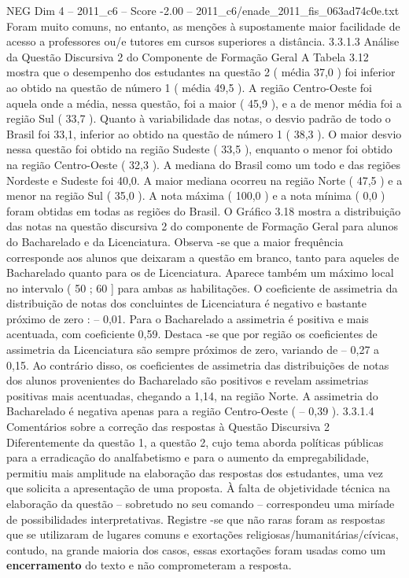 \begin{textsample}{NEG Dim 4 – 2011\_c6 – Score -2.00 – 2011\_c6/enade\_2011\_fis\_063ad74c0e.txt}
Foram muito comuns, no entanto, as menções à supostamente maior facilidade de acesso a professores ou/e tutores em cursos superiores a distância. 3.3.1.3 Análise da Questão Discursiva 2 do Componente de Formação Geral A Tabela 3.12 mostra que o desempenho dos estudantes na questão 2 ( média 37,0 ) foi inferior ao obtido na questão de número 1 ( média 49,5 ).
A região Centro-Oeste foi aquela onde a média, nessa questão, foi a maior ( 45,9 ), e a de menor média foi a região Sul ( 33,7 ).
Quanto à variabilidade das notas, o desvio padrão de todo o Brasil foi 33,1, inferior ao obtido na questão de número 1 ( 38,3 ).
O maior desvio nessa questão foi obtido na região Sudeste ( 33,5 ), enquanto o menor foi obtido na região Centro-Oeste ( 32,3 ).
A mediana do Brasil como um todo e das regiões Nordeste e Sudeste foi 40,0.
A maior mediana ocorreu na região Norte ( 47,5 ) e a menor na região Sul ( 35,0 ).
A nota máxima ( 100,0 ) e a nota mínima ( 0,0 ) foram obtidas em todas as regiões do Brasil.
O Gráfico 3.18 mostra a distribuição das notas na questão discursiva 2 do componente de Formação Geral para alunos do Bacharelado e da Licenciatura.
Observa -se que a maior frequência corresponde aos alunos que deixaram a questão em branco, tanto para aqueles de Bacharelado quanto para os de Licenciatura.
Aparece também um máximo local no intervalo ( 50 ; 60 ] para ambas as habilitações.
O coeficiente de assimetria da distribuição de notas dos concluintes de Licenciatura é negativo e bastante próximo de zero : – 0,01.
Para o Bacharelado a assimetria é positiva e mais acentuada, com coeficiente 0,59.
Destaca -se que por região os coeficientes de assimetria da Licenciatura são sempre próximos de zero, variando de – 0,27 a 0,15.
Ao contrário disso, os coeficientes de assimetria das distribuições de notas dos alunos provenientes do Bacharelado são positivos e revelam assimetrias positivas mais acentuadas, chegando a 1,14, na região Norte.
A assimetria do Bacharelado é negativa apenas para a região Centro-Oeste ( – 0,39 ). 3.3.1.4 Comentários sobre a correção das respostas à Questão Discursiva 2 Diferentemente da questão 1, a questão 2, cujo tema aborda políticas públicas para a erradicação do analfabetismo e para o aumento da empregabilidade, permitiu mais amplitude na elaboração das respostas dos estudantes, uma vez que solicita a apresentação de uma proposta.
À falta de objetividade técnica na elaboração da questão – sobretudo no seu comando – correspondeu uma miríade de possibilidades interpretativas.
Registre -se que não raras foram as respostas que se utilizaram de lugares comuns e exortações religiosas/humanitárias/cívicas, contudo, na grande maioria dos casos, essas exortações foram usadas como um \textbf{encerramento} do texto e não comprometeram a resposta.

\end{textsample}
